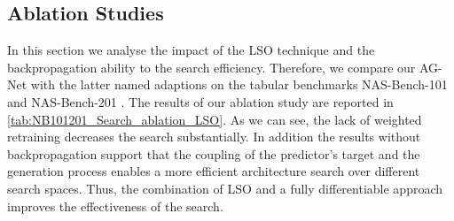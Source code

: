 \documentclass[runningheads]{llncs}
\begin{document}
\begin{table*}[t]
\caption{Ablation: Search results on NAS-Bench-101 and NAS-Bench-201 using AG-Net (mean over 10 trials with a maximal query amount of $192$).}
\label{tab:NB101201_Search_ablation_LSO}
\scriptsize
\begin{center}
\end{center}
\end{table*}

\subsection{Ablation Studies}\label{sec:ablation_studies}

In this section we analyse the impact of the LSO technique and the backpropagation ability to the search efficiency. Therefore, we compare our AG-Net with the latter named adaptions on the tabular benchmarks NAS-Bench-101 \cite{2019NB101} and NAS-Bench-201 \cite{2020NB201}. The results of our ablation study are reported in \autoref{tab:NB101201_Search_ablation_LSO}.
As we can see, the lack of weighted retraining decreases the search substantially. 
In addition the results without backpropagation support that the coupling of the predictor's target and the generation process enables a more efficient architecture search over different search spaces. Thus, the combination of LSO and a fully differentiable approach improves the effectiveness of the search.
\end{document}
